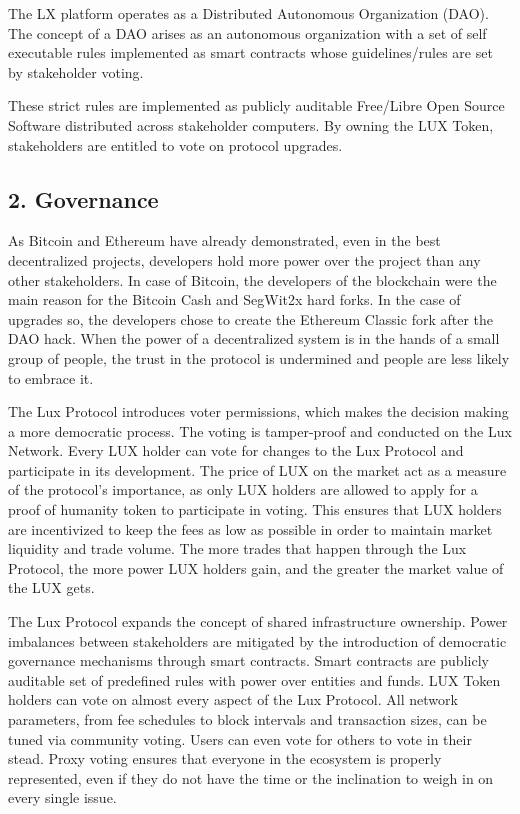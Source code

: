 \documentclass[11pt]{article}
\begin{document}
The LX platform operates as a Distributed Autonomous Organization (DAO). The concept of a DAO arises as an autonomous organization with a set of self executable rules implemented as smart contracts whose guidelines/rules are set by stakeholder voting.


These strict rules are implemented as publicly auditable Free/Libre Open Source Software distributed across stakeholder computers. By owning the LUX Token, stakeholders are entitled to vote on protocol upgrades.


\subsection{2. Governance}

As Bitcoin and Ethereum have already demonstrated, even in the best decentralized projects, developers hold more power over the project than any other stakeholders. In case of Bitcoin, the developers of the blockchain were the main reason for the Bitcoin Cash and SegWit2x hard forks. In the case of upgrades so, the developers chose to create the Ethereum Classic fork after the DAO hack. When the power of a decentralized system is in the hands of a small group of people, the trust in the protocol is undermined and people are less likely to embrace it.


The Lux Protocol introduces voter permissions, which makes the decision making a more democratic process. The voting is tamper-proof and conducted on the Lux Network. Every LUX holder can vote for changes to the Lux Protocol and participate in its development. The price of LUX on the market act as a measure of the protocol's importance, as only LUX holders are allowed to apply for a proof of humanity token to participate in voting. This ensures that LUX holders are incentivized to keep the fees as low as possible in order to maintain market liquidity and trade volume. The more trades that happen through the Lux Protocol, the more power LUX holders gain, and the greater the market value of the LUX gets.


The Lux Protocol expands the concept of shared infrastructure ownership. Power imbalances between stakeholders are mitigated by the introduction of democratic governance mechanisms through smart contracts. Smart contracts are publicly auditable set of predefined rules with power over entities and funds. LUX Token holders can vote on almost every aspect of the Lux Protocol. All network parameters, from fee schedules to block intervals and transaction sizes, can be tuned via community voting. Users can even vote for others to vote in their stead. Proxy voting ensures that everyone in the ecosystem is properly represented, even if they do not have the time or the inclination to weigh in on every single issue.
\end{document}
